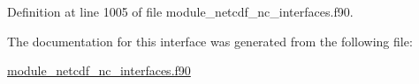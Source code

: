 Definition at line 1005 of file module\+\_\+netcdf\+\_\+nc\+\_\+interfaces.\+f90.



The documentation for this interface was generated from the following file\+:\begin{DoxyCompactItemize}
\item 
\hyperlink{module__netcdf__nc__interfaces_8f90}{module\+\_\+netcdf\+\_\+nc\+\_\+interfaces.\+f90}\end{DoxyCompactItemize}
